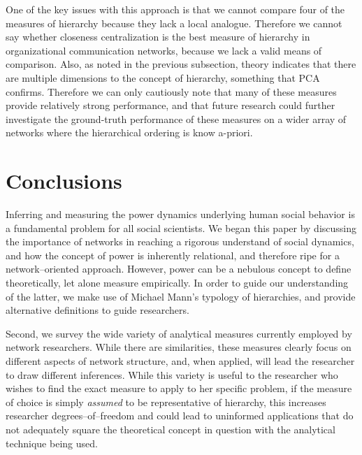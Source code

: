 \documentclass[3p,times]{elsarticle}
\begin{document}
One of the key issues with this approach is that we cannot compare four of the measures of hierarchy because they lack a local analogue. Therefore we cannot say whether closeness centralization is the best measure of hierarchy in organizational communication networks, because we lack a valid means of comparison. Also, as noted in the previous subsection, theory indicates that there are multiple dimensions to the concept of hierarchy, something that PCA confirms. Therefore we can only cautiously note that many of these measures provide relatively strong performance, and that future research could further investigate the ground-truth performance of these measures on a wider array of networks where the hierarchical ordering is know a-priori.


\section{Conclusions}
Inferring and measuring the power dynamics underlying human social behavior is a fundamental problem for all social scientists. We began this paper by discussing the importance of networks in reaching a rigorous understand of social dynamics, and how the concept of power is inherently relational, and therefore ripe for a network--oriented approach. However, power can be a nebulous concept to define theoretically, let alone measure empirically. In order to guide our understanding of the latter, we make use of Michael Mann's typology of hierarchies, and provide alternative definitions to guide researchers.

Second, we survey the wide variety of analytical measures currently employed by network researchers. While there are similarities, these measures clearly focus on different aspects of network structure, and, when applied, will lead the researcher to draw different inferences. While this variety is useful to the researcher who wishes to find the exact measure to apply to her specific problem, if the measure of choice is simply \emph{assumed} to be representative of hierarchy, this increases researcher degrees--of--freedom and could lead to uninformed applications that do not adequately square the theoretical concept in question with the analytical technique being used.

\end{document}
